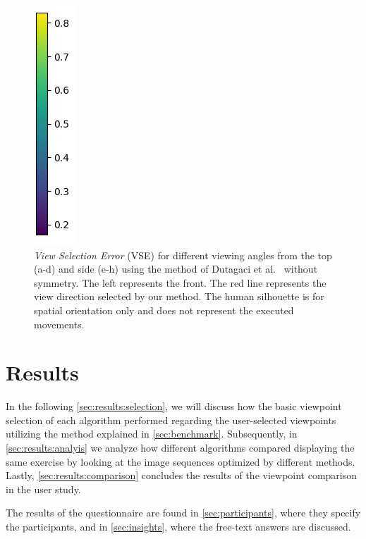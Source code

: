 \begin{figure}[ht]
	    \includegraphics[width=0.041\linewidth]{pictures/scale.png}
	\caption{\emph{View Selection Error} (VSE) for different viewing angles from the top (a-d) and side (e-h) using the method of Dutagaci et al.~\cite{dutagaci2010bbv} without symmetry. The left represents the front. The red line represents the view direction selected by our method. The human silhouette is for spatial orientation only and does not represent the executed movements.}
	\label{fig:colorMaps}
\end{figure}

\section{Results \label{results}}
In the following \autoref{sec:results:selection}, we will discuss how the basic viewpoint selection of each algorithm performed regarding the user-selected viewpoints utilizing the method explained in \autoref{sec:benchmark}. Subsequently, in \autoref{sec:results:analyis} we analyze how different algorithms compared displaying the same exercise by looking at the image sequences optimized by different methods. Lastly, \autoref{sec:results:comparison} concludes the results of the viewpoint comparison in the user study.

The results of the questionnaire are found in \autoref{sec:participants}, where they specify the participants, and in \autoref{sec:insights}, where the free-text answers are discussed.


